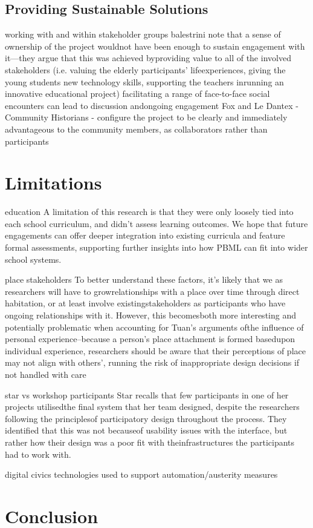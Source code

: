 \subsection{Providing Sustainable Solutions}
working with and within stakeholder groups
balestrini note that a sense of ownership of the project wouldnot have been enough to sustain engagement with it—they argue that this was achieved byproviding value to all of the involved stakeholders (i.e. valuing the elderly participants’ lifeexperiences, giving the young students new technology skills, supporting the teachers inrunning an innovative educational project)
 facilitating a range of face-to-face social encounters can lead to discussion andongoing engagement
 Fox and Le Dantex - Community Historians - configure the project to be clearly and immediately advantageous to the community members, as collaborators rather than participants

\section{Limitations}

education
A limitation of this research is that they were only loosely tied into each school curriculum, and didn't assess learning outcomes. We hope that future engagements can offer deeper integration into existing curricula and feature formal assessments, supporting further insights into how PBML can fit into wider school systems. 

place stakeholders
To better understand these factors, it’s likely that we as researchers will have to growrelationships with a place over time through direct habitation, or at least involve existingstakeholders as participants who have ongoing relationships with it. However, this becomesboth more interesting and potentially problematic when accounting for Tuan’s arguments ofthe influence of personal experience–because a person’s place attachment is formed basedupon individual experience, researchers should be aware that their perceptions of place may not align with others’, running the risk of inappropriate design decisions if not handled with care

star vs workshop participants
Star recalls that few participants in one of her projects utilisedthe final system that her team designed, despite the researchers following the principlesof participatory design throughout the process.  They identified that this was not becauseof usability issues with the interface, but rather how their design was a poor fit with theinfrastructures the participants had to work with. 

digital civics technologies used to support automation/austerity measures

\section{Conclusion}